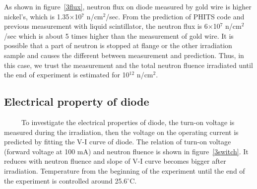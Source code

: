 As shown in figure~\ref{3flux}, neutron flux on diode measured by gold wire is higher nickel's, which is 1.35$\times$10$^7$ n/cm$^2$/sec.
From the prediction of PHITS code and previous measurement with liquid scintillator, the neutron flux is 6$\times$10$^7$ n/cm$^2$/sec which is about 5 times higher than the measurement of gold wire.
It is possible that a part of neutron is stopped at flange or the other irradiation sample and causes the different between measurement and prediction.
Thus, in this case, we trust the measurement and the total neutron fluence irradiated until the end of experiment is estimated for 10$^{12}$ n/cm$^2$.

  \subsection{Electrical property of diode}
~~~~~To investigate the electrical properties of diode, the turn-on voltage is measured during the irradiation, then the voltage on the operating current is predicted by fitting the V-I curve of diode.
The relation of turn-on voltage (forward voltage at 100 mA) and neutron fluence is shown in figure~\ref{3switch}.
It reduces with neutron fluence and slope of V-I curve becomes bigger after irradiation.
Temperature from the beginning of the experiment until the end of the experiment is controlled around 25.6$^{\circ}$C.

